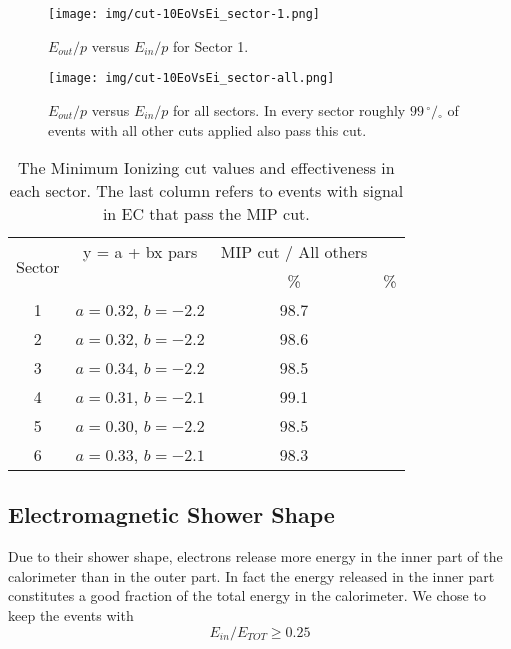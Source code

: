\begin{figure}[ht]
  \centering
		\texttt{[image: img/cut-10EoVsEi\_sector-1.png]}
		\caption{$E_{out}/p$ versus $E_{in}/p$ for Sector 1.}
 		\label{fig:EoEi}
\end{figure}


\clearpage\newpage
\begin{figure}[ht]
  \centering
		\texttt{[image: img/cut-10EoVsEi\_sector-all.png]}
		\caption{$E_{out}/p$ versus $E_{in}/p$ for all sectors. In every sector
					roughly $99\,^{\circ\!\!}/\!_\circ$ of events with all other cuts applied also pass this cut. }
 		\label{fig:EoEi_all}
\end{figure}

\begin{table}[ht]
\label{tab:EoEi}
	\begin{center}
		\begin{tabular}{c | c | c | c}
			\hline 
			\multirow{2}{*}{Sector} 
					& y = a + bx pars & MIP cut / All others \\
					&   & \% & \% \\
			\hline
			1    & $a=0.32$, $b=-2.2$ & 98.7 \\
			2    & $a=0.32$, $b=-2.2$ & 98.6 \\
			3    & $a=0.34$, $b=-2.2$ & 98.5 \\
			4    & $a=0.31$, $b=-2.1$ &  99.1 \\
			5    & $a=0.30$, $b=-2.2$ &  98.5 \\
			6    & $a=0.33$, $b=-2.1$ &  98.3 \\
			\hline
		\end{tabular}
		\caption{The Minimum Ionizing cut values and effectiveness in each sector.
					The last column refers to events with signal in EC that pass the MIP cut.}	
	\end{center}
\end{table}





\subsection{Electromagnetic Shower Shape}
Due to their shower shape, electrons release more energy in 
the inner part of the calorimeter than in the outer part. In
fact the energy released in the inner part constitutes a good
fraction of the total energy in the calorimeter.
We chose to keep the events with $$E_{in}/E_{TOT} \geq 0.25$$

